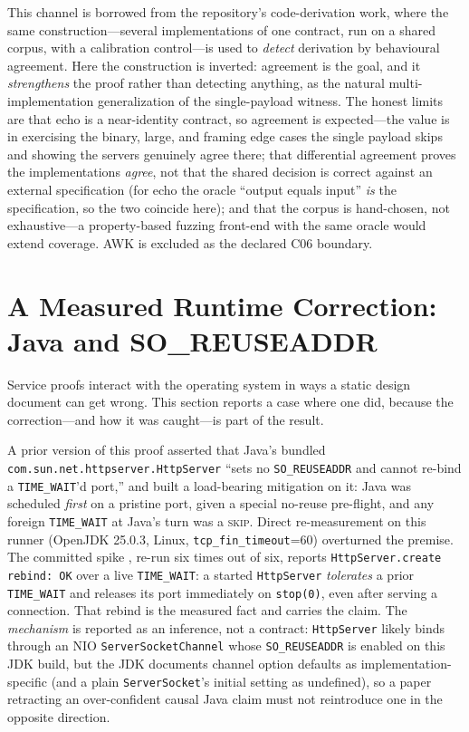 \documentclass[11pt,letterpaper]{article}
\begin{document}
This channel is borrowed from the repository's code-derivation work, where the
same construction---several implementations of one contract, run on a shared
corpus, with a calibration control---is used to \emph{detect} derivation by
behavioural agreement. Here the construction is inverted: agreement is the goal,
and it \emph{strengthens} the proof rather than detecting anything, as the natural
multi-implementation generalization of the single-payload witness. The honest
limits are that echo is a near-identity contract, so agreement is expected---the
value is in exercising the binary, large, and framing edge cases the single
payload skips and showing the servers genuinely agree there; that differential
agreement proves the implementations \emph{agree}, not that the shared decision is
correct against an external specification (for echo the oracle ``output equals
input'' \emph{is} the specification, so the two coincide here); and that the corpus
is hand-chosen, not exhaustive---a property-based fuzzing front-end with the same
oracle would extend coverage. AWK is excluded as the declared C06 boundary.

\section{A Measured Runtime Correction: Java and SO\_REUSEADDR}
\label{sec:java}

Service proofs interact with the operating system in ways a static
design document can get wrong. This section reports a case where one did,
because the correction---and how it was caught---is part of the result.

A prior version of this proof asserted that Java's bundled
\texttt{com.sun.net.httpserver.HttpServer} ``sets no \texttt{SO\_REUSEADDR}
and cannot re-bind a \texttt{TIME\_WAIT}'d port,'' and built a
load-bearing mitigation on it: Java was scheduled \emph{first} on a
pristine port, given a special no-reuse pre-flight, and any foreign
\texttt{TIME\_WAIT} at Java's turn was a \textsc{skip}. Direct
re-measurement on this runner (OpenJDK 25.0.3, Linux,
\texttt{tcp\_fin\_timeout}=60) overturned the premise. The committed
spike , re-run six times out of six,
reports \texttt{HttpServer.create rebind: OK} over a live
\texttt{TIME\_WAIT}: a started \texttt{HttpServer} \emph{tolerates} a prior
\texttt{TIME\_WAIT} and releases its port immediately on \texttt{stop(0)},
even after serving a connection. That rebind is the measured fact and
carries the claim. The \emph{mechanism} is reported as an inference, not a
contract: \texttt{HttpServer} likely binds through an NIO
\texttt{ServerSocketChannel} whose \texttt{SO\_REUSEADDR} is enabled on this
JDK build, but the JDK documents channel option defaults as
implementation-specific (and a plain \texttt{ServerSocket}'s initial setting
as undefined), so a paper retracting an over-confident causal Java claim must
not reintroduce one in the opposite direction.
\end{document}
